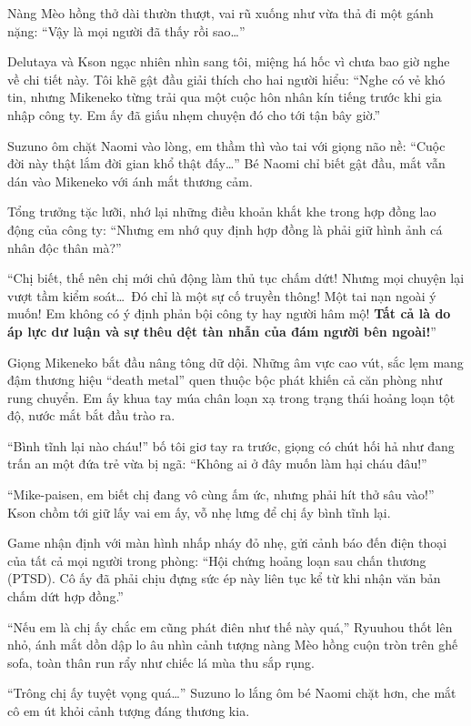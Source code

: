 ﻿\documentclass[../main.tex]{subfiles}
\begin{document}
Nàng Mèo hồng thở dài thườn thượt, vai rũ xuống như vừa thả đi một gánh nặng: ``Vậy là mọi người đã thấy rồi sao\dots''

Delutaya và Kson ngạc nhiên nhìn sang tôi, miệng há hốc vì chưa bao giờ nghe về chi tiết này. Tôi khẽ gật đầu giải thích cho hai người hiểu: ``Nghe có vẻ khó tin, nhưng Mikeneko từng trải qua một cuộc hôn nhân kín tiếng trước khi gia nhập công ty. Em ấy đã giấu nhẹm chuyện đó cho tới tận bây giờ.''

Suzuno ôm chặt Naomi vào lòng, em thầm thì vào tai với giọng não nề: ``Cuộc đời này thật lắm đời gian khổ thật đấy\dots'' Bé Naomi chỉ biết gật đầu, mắt vẫn dán vào Mikeneko với ánh mắt thương cảm.

Tổng trưởng tặc lưỡi, nhớ lại những điều khoản khắt khe trong hợp đồng lao động của công ty: ``Nhưng em nhớ quy định hợp đồng là phải giữ hình ảnh cá nhân độc thân mà?''

``Chị biết, thế nên chị mới chủ động làm thủ tục chấm dứt! Nhưng mọi chuyện lại vượt tầm kiểm soát\dots\ Đó chỉ là một sự cố truyền thông! Một tai nạn ngoài ý muốn! Em không có ý định phản bội công ty hay người hâm mộ! \textbf{Tất cả là do áp lực dư luận và sự thêu dệt tàn nhẫn của đám người bên ngoài!}''

Giọng Mikeneko bắt đầu nâng tông dữ dội. Những âm vực cao vút, sắc lẹm mang đậm thương hiệu ``death metal'' quen thuộc bộc phát khiến cả căn phòng như rung chuyển. Em ấy khua tay múa chân loạn xạ trong trạng thái hoảng loạn tột độ, nước mắt bắt đầu trào ra.

``Bình tĩnh lại nào cháu!'' bố tôi giơ tay ra trước, giọng có chút hối hả như đang trấn an một đứa trẻ vừa bị ngã: ``Không ai ở đây muốn làm hại cháu đâu!''

``Mike-paisen, em biết chị đang vô cùng ấm ức, nhưng phải hít thở sâu vào!'' Kson chồm tới giữ lấy vai em ấy, vỗ nhẹ lưng để chị ấy bình tĩnh lại.

Game nhận định với màn hình nhấp nháy đỏ nhẹ, gửi cảnh báo đến điện thoại của tất cả mọi người trong phòng: ``Hội chứng hoảng loạn sau chấn thương (PTSD). Cô ấy đã phải chịu đựng sức ép này liên tục kể từ khi nhận văn bản chấm dứt hợp đồng.''

``Nếu em là chị ấy chắc em cũng phát điên như thế này quá,'' Ryuuhou thốt lên nhỏ, ánh mắt dồn dập lo âu nhìn cảnh tượng nàng Mèo hồng cuộn tròn trên ghế sofa, toàn thân run rẩy như chiếc lá mùa thu sắp rụng.

``Trông chị ấy tuyệt vọng quá\dots'' Suzuno lo lắng ôm bé Naomi chặt hơn, che mắt cô em út khỏi cảnh tượng đáng thương kia.
\end{document}
